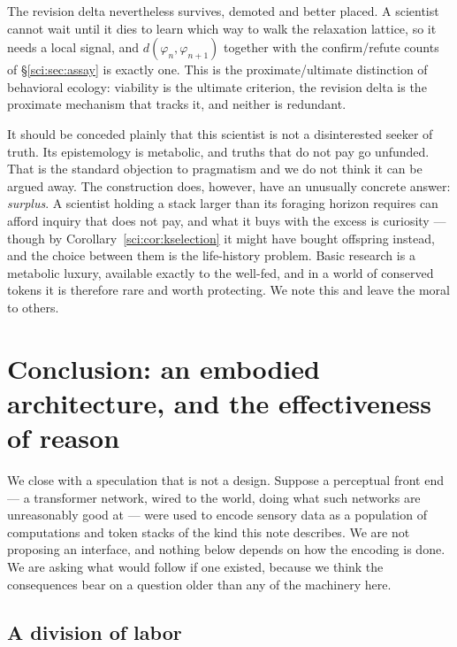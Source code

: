 The revision delta nevertheless survives, demoted and better placed. A scientist cannot wait until it
dies to learn which way to walk the relaxation lattice, so it needs a local signal, and
$d(\varphi_n, \varphi_{n+1})$ together with the confirm/refute counts of \S\ref{sci:sec:assay} is exactly
one. This is the proximate/ultimate distinction of behavioral ecology: viability is the ultimate
criterion, the revision delta is the proximate mechanism that tracks it, and neither is redundant.

\begin{remark}
\label{sci:rem:pragmatist}
It should be conceded plainly that this scientist is not a disinterested seeker of truth. Its
epistemology is metabolic, and truths that do not pay go unfunded. That is the standard objection to
pragmatism and we do not think it can be argued away. The construction does, however, have an unusually
concrete answer: \emph{surplus}. A scientist holding a stack larger than its foraging horizon requires
can afford inquiry that does not pay, and what it buys with the excess is curiosity --- though by
Corollary~\ref{sci:cor:kselection} it might have bought offspring instead, and the choice between them is
the life-history problem. Basic research is
a metabolic luxury, available exactly to the well-fed, and in a world of conserved tokens it is
therefore rare and worth protecting. We note this and leave the moral to others.
\end{remark}

\section{Conclusion: an embodied architecture, and the effectiveness of reason}\label{sci:S17}
\label{sci:sec:conclusion}

We close with a speculation that is not a design. Suppose a perceptual front end --- a transformer
network, wired to the world, doing what such networks are unreasonably good at --- were used to encode
sensory data as a population of computations and token stacks of the kind this note describes. We are
not proposing an interface, and nothing below depends on how the encoding is done. We are asking what
would follow if one existed, because we think the consequences bear on a question older than any of
the machinery here.

\subsection{A division of labor}\label{sci:S17.1}

